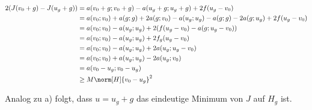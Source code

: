 \begin{solution}
\begin{enumerate}[label = \textbf{\alph*)}]
  \begin{align*}
    2(J(v_0 + g) - J(u_g + g))
    & =
    a(v_0 + g; v_0 + g) - a(u_g + g; u_g + g) + 2f(u_g - v_0) \\
    & =
    a(v_0; v_0) + a(g; g) + 2a(g; v_0) - a(u_g; u_g) - a(g; g) - 2a (g; u_g) + 2 f(u_g - v_0) \\
    & =
    a(v_0; v_0)  - a(u_g; u_g) + 2(f(u_g - v_0) - a(g; u_g - v_0)) \\
    & =
    a(v_0; v_0)  - a(u_g; u_g) + 2f_g(u_g - v_0) \\
    & =
    a(v_0; v_0)  - a(u_g; u_g) + 2a(u_g; u_g - v_0) \\
    & =
    a(v_0; v_0)  + a(u_g; u_g) - 2a(u_g; v_0) \\
    & =
    a(v_0 - u_g; v_0 - u_g) \\
    & \geq M \norm[H]{v_0 - u_g}^2
  \end{align*}

  Analog zu a) folgt, dass $u = u_g + g$ das eindeutige Minimum von $J$ auf $H_g$ ist.

\end{enumerate}

\end{solution}

